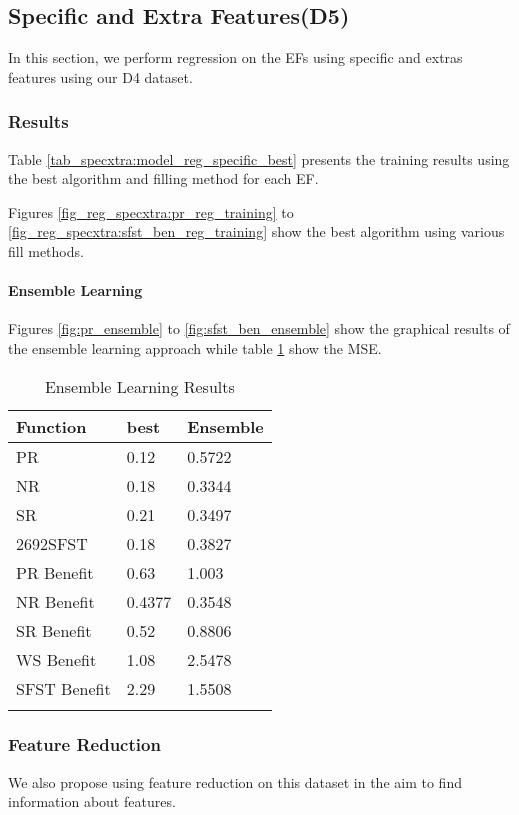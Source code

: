 \documentclass[12pt,letterpaper]{article}
\begin{document}
\clearpage
\subsection{Specific and Extra Features(D5)}
In this section, we perform regression on the \ac{EF}s using specific and extras features using our D4 dataset.

\subsubsection{Results}
Table \ref{tab_specxtra:model_reg_specific_best} presents the training results using the best algorithm and filling method for each \ac{EF}.

Figures \ref{fig_reg_specxtra:pr_reg_training} to \ref{fig_reg_specxtra:sfst_ben_reg_training} show the best algorithm using various fill methods.

\paragraph{Ensemble Learning}
Figures \ref{fig:pr_ensemble} to \ref{fig:sfst_ben_ensemble} show the graphical results of the ensemble learning approach while table \ref{tab:ensmeble} show the MSE.


\begin{longtable}{|p{3cm}|p{4cm}|p{4cm}|}
\hline
\textbf{Function} & \textbf{best} & \textbf{Ensemble}  \\ \hline


PR & 0.12 & 0.5722 \\ \hline
NR & 0.18 & 0.3344\\\hline
SR & 0.21 & 0.3497  \\ \hline
2692SFST & 0.18 & 0.3827  \\ \hline

PR Benefit & 0.63 & 1.003 \\ \hline
NR Benefit & 0.4377 & 0.3548 \\ \hline
SR Benefit & 0.52 & 0.8806  \\ \hline
WS Benefit & 1.08 & 2.5478  \\ \hline
SFST Benefit & 2.29 & 1.5508  \\ \hline
\caption{Ensemble Learning Results}
\label{tab:ensmeble}
\end{longtable}





\subsubsection{Feature Reduction}
We also propose using feature reduction on this dataset in the aim to find information about features.
\end{document}
